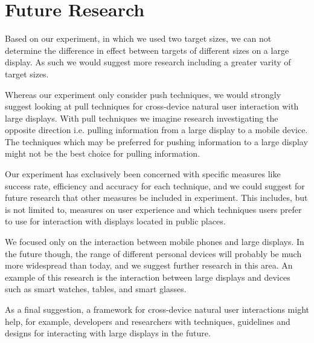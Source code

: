\section{Future Research} \label{sec:futureresearch}
Based on our experiment, in which we used two target sizes, we can not determine the difference in effect between targets of different sizes on a large display. As such we would suggest more research including a greater varity of target sizes.

Whereas our experiment only consider push techniques, we would strongly suggest looking at pull techniques for cross-device natural user interaction with large displays.
With pull techniques we imagine research investigating the opposite direction i.e. pulling information from a large display to a mobile device.
The techniques which may be preferred for pushing information to a large display might not be the best choice for pulling information.

Our experiment has exclusively been concerned with specific measures like success rate, efficiency and accuracy for each technique, and we could suggest for future research that other measures be included in experiment.
This includes, but is not limited to, measures on user experience and which techniques users prefer to use for interaction with displays located in public places.

We focused only on the interaction between mobile phones and large displays.
In the future though, the range of different personal devices will probably be much more widespread than today, and we suggest further research in this area.
An example of this research is the interaction between large displays and devices such as smart watches, tables, and smart glasses.

As a final suggestion, a framework for cross-device natural user interactions might help, for example, developers and researchers with techniques, guidelines and designs for interacting with large displays in the future.